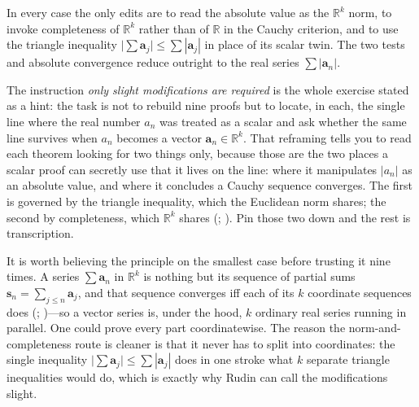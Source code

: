 \documentclass[main.tex]{subfiles}
\begin{document}
\begin{SolutionBlue}
In every case the only edits are to read the absolute value as the $\mathbb R^k$ norm, to invoke
completeness of $\mathbb R^k$ rather than of $\mathbb R$ in the Cauchy criterion, and to use the
triangle inequality $\bigl|\sum\mathbf a_j\bigr|\le\sum|\mathbf a_j|$ in place of its scalar twin. The
two tests and absolute convergence reduce outright to the real series $\sum|\mathbf a_n|$.
\end{SolutionBlue}

\begin{Reflection}
The instruction \emph{only slight modifications are required} is the whole exercise stated as a hint:
the task is not to rebuild nine proofs but to locate, in each, the single line where the real number
$a_n$ was treated as a scalar and ask whether the same line survives when $a_n$ becomes a vector
$\mathbf a_n\in\mathbb R^k$. That reframing tells you to read each theorem looking for two things only,
because those are the two places a scalar proof can secretly use that it lives on the line: where it
manipulates $|a_n|$ as an absolute value, and where it concludes a Cauchy sequence converges. The first
is governed by the triangle inequality, which the Euclidean norm shares; the second by completeness,
which $\mathbb R^k$ shares (; ). Pin those two
down and the rest is transcription.

It is worth believing the principle on the smallest case before trusting it nine times. A series
$\sum\mathbf a_n$ in $\mathbb R^k$ is nothing but its sequence of partial sums $\mathbf s_n=\sum_{j\le
n}\mathbf a_j$, and that sequence converges iff each of its $k$ coordinate sequences does
(; )---so a vector series is, under the
hood, $k$ ordinary real series running in parallel. One could prove every part coordinatewise. The
reason the norm-and-completeness route is cleaner is that it never has to split into coordinates: the
single inequality $\bigl|\sum\mathbf a_j\bigr|\le\sum|\mathbf a_j|$ does in one stroke what $k$ separate
triangle inequalities would do, which is exactly why Rudin can call the modifications slight.


\end{Reflection}
\end{document}
